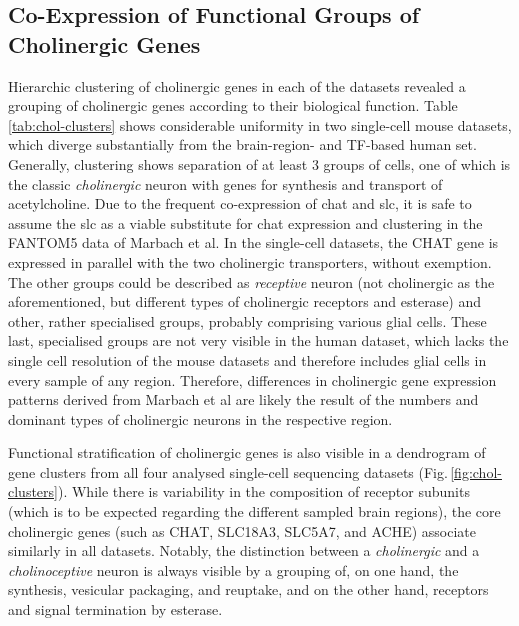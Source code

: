 \subsection{Co-Expression of Functional Groups of Cholinergic Genes}
Hierarchic clustering of cholinergic genes in each of the datasets revealed a grouping of cholinergic genes according to their biological function. Table \ref{tab:chol-clusters} shows considerable uniformity in two single-cell mouse datasets, which diverge substantially from the brain-region- and TF-based human set. Generally, clustering shows separation of at least 3 groups of cells, one of which is the classic \emph{cholinergic} neuron with genes for synthesis and transport of acetylcholine. Due to the frequent co-expression of \ac{chat} and \ac{slc}, it is safe to assume the \ac{slc} as a viable substitute for chat expression and clustering in the FANTOM5 data of Marbach et al. In the single-cell datasets, the CHAT gene is expressed in parallel with the two cholinergic transporters, without exemption. The other groups could be described as \emph{receptive} neuron (not cholinergic as the aforementioned, but different types of cholinergic receptors and esterase) and other, rather specialised groups, probably comprising various glial cells. These last, specialised groups are not very visible in the human dataset, which lacks the single cell resolution of the mouse datasets and therefore includes glial cells in every sample of any region. Therefore, differences in cholinergic gene expression patterns derived from Marbach et al are likely the result of the numbers and dominant types of cholinergic neurons in the respective region.

Functional stratification of cholinergic genes is also visible in a dendrogram of gene clusters from all four analysed single-cell sequencing datasets (Fig.\,\ref{fig:chol-clusters}). While there is variability in the composition of receptor subunits (which is to be expected regarding the different sampled brain regions), the core cholinergic genes (such as CHAT, SLC18A3, SLC5A7, and ACHE) associate similarly in all datasets. Notably, the distinction between a \emph{cholinergic} and a \emph{cholinoceptive} neuron is always visible by a grouping of, on one hand, the synthesis, vesicular packaging, and reuptake, and on the other hand, receptors and signal termination by esterase.

